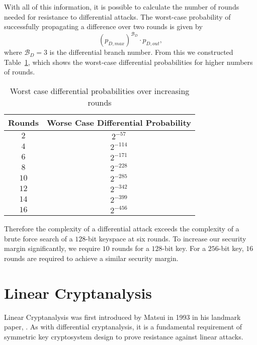 With all of this information, it is possible to calculate the number of rounds needed for resistance to differential attacks.
The worst-case probability of successfully propagating a difference over two rounds is given by
\begin{equation*}
(p_{D,max})^{\mathcal{B}_D} \cdot p_{D,out},
\end{equation*}
where $\mathcal{B}_D = 3$ is the differential branch number.
From this we constructed Table~\ref{tab:DifferentialProbabilities}, which shows the worst-case differential probabilities for higher numbers of rounds.
\begin{table}[ht]
\centering
\begin{tabular}{c|c}
Rounds & Worse Case Differential Probability \\
\hline
$2$  & $2^{-57}$  \\
$4$  & $2^{-114}$ \\
$6$  & $2^{-171}$ \\
$8$  & $2^{-228}$ \\
$10$ & $2^{-285}$ \\
$12$ & $2^{-342}$ \\
$14$ & $2^{-399}$ \\
$16$ & $2^{-456}$ \\
\end{tabular}
\caption{Worst case differential probabilities over increasing rounds}
\label{tab:DifferentialProbabilities}
\end{table}

Therefore the complexity of a differential attack exceeds the complexity of a brute force search of a $128$-bit keyspace at six rounds.
To increase our security margin significantly, we require $10$ rounds for a $128$-bit key.
For a $256$-bit key, $16$ rounds are required to achieve a similar security margin.

\section{Linear Cryptanalysis}
Linear Cryptanalysis was first introduced by Matsui in 1993 in his landmark paper, \cite{Matsui1993_Linear}.
As with differential cryptanalysis, it is a fundamental requirement of symmetric key cryptosystem design to prove resistance against linear attacks.

